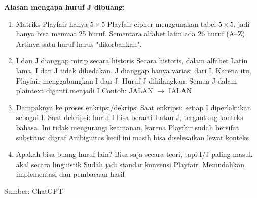 \documentclass{article}
\begin{document}

\textbf{Alasan mengapa huruf J dibuang:}

\begin{enumerate}
    \item Matriks Playfair hanya $5\times 5$
    Playfair cipher menggunakan tabel $5\times 5$, jadi hanya bisa memuat 25 huruf. Sementara alfabet latin ada 26 huruf (A--Z). Artinya satu huruf harus "dikorbankan".

    \item I dan J dianggap mirip secara historis
    Secara historis, dalam alfabet Latin lama, I dan J tidak dibedakan. J dianggap hanya variasi dari I. Karena itu, Playfair menggabungkan I dan J. Huruf J dihilangkan. Semua J dalam plaintext diganti menjadi I
    Contoh: JALAN $\rightarrow$ IALAN

    \item Dampaknya ke proses enkripsi/dekripsi
    Saat enkripsi: setiap I diperlakukan sebagai I. Saat dekripsi: huruf I bisa berarti I atau J, tergantung konteks bahasa. Ini tidak mengurangi keamanan, karena Playfair sudah bersifat substitusi digraf
    Ambiguitas kecil ini masih bisa diselesaikan lewat konteks

    \item Apakah bisa buang huruf lain?
    Bisa saja secara teori, tapi I/J paling masuk akal secara linguistik
    Sudah jadi standar konvensi Playfair. Memudahkan implementasi dan pembacaan hasil
\end{enumerate}

\begin{flushright}
Sumber: ChatGPT
\end{flushright}
\end{document}
